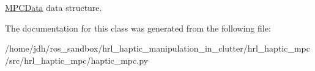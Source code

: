 \hyperlink{classhrl__haptic__mpc_1_1haptic__mpc_1_1_m_p_c_data}{\-M\-P\-C\-Data} data structure. 



\-The documentation for this class was generated from the following file\-:\begin{DoxyCompactItemize}
\item 
/home/jdh/ros\-\_\-sandbox/hrl\-\_\-haptic\-\_\-manipulation\-\_\-in\-\_\-clutter/hrl\-\_\-haptic\-\_\-mpc/src/hrl\-\_\-haptic\-\_\-mpc/haptic\-\_\-mpc.\-py\end{DoxyCompactItemize}
